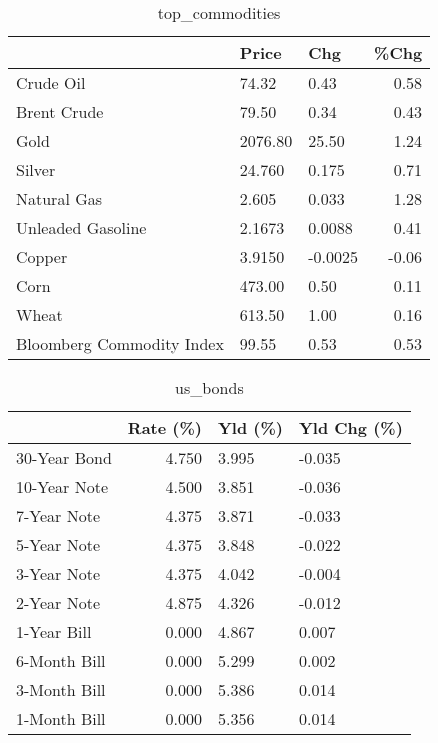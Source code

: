 \documentclass{article}%
\begin{document}
\begin{table}[htbp]%
\caption{top\_commodities}%
\centering%
\begin{adjustbox}{width=1\textwidth}%
\begin{tabular}{lllr}
\toprule
                          &   Price &     Chg &  \%Chg \\
\midrule
               Crude Oil  &   74.32 &    0.43 &  0.58 \\
             Brent Crude  &   79.50 &    0.34 &  0.43 \\
                    Gold  & 2076.80 &   25.50 &  1.24 \\
                  Silver  &  24.760 &   0.175 &  0.71 \\
             Natural Gas  &   2.605 &   0.033 &  1.28 \\
       Unleaded Gasoline  &  2.1673 &  0.0088 &  0.41 \\
                  Copper  &  3.9150 & -0.0025 & -0.06 \\
                    Corn  &  473.00 &    0.50 &  0.11 \\
                   Wheat  &  613.50 &    1.00 &  0.16 \\
Bloomberg Commodity Index &   99.55 &    0.53 &  0.53 \\
\bottomrule
\end{tabular}
%
\end{adjustbox}%
\end{table}

%


\begin{table}[htbp]%
\caption{us\_bonds}%
\centering%
\begin{adjustbox}{width=1\textwidth}%
\begin{tabular}{lrll}
\toprule
             &  Rate (\%) & Yld (\%) & Yld Chg (\%) \\
\midrule
30-Year Bond &     4.750 &   3.995 &      -0.035 \\
10-Year Note &     4.500 &   3.851 &      -0.036 \\
 7-Year Note &     4.375 &   3.871 &      -0.033 \\
 5-Year Note &     4.375 &   3.848 &      -0.022 \\
 3-Year Note &     4.375 &   4.042 &      -0.004 \\
 2-Year Note &     4.875 &   4.326 &      -0.012 \\
 1-Year Bill &     0.000 &   4.867 &       0.007 \\
6-Month Bill &     0.000 &   5.299 &       0.002 \\
3-Month Bill &     0.000 &   5.386 &       0.014 \\
1-Month Bill &     0.000 &   5.356 &       0.014 \\
\bottomrule
\end{tabular}
%
\end{adjustbox}%
\end{table}
\end{document}
